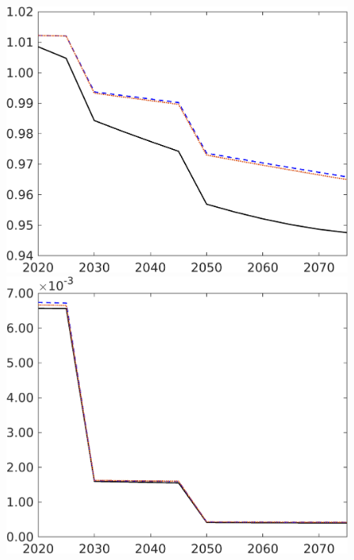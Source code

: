 \begin{figure}[h!!]
\begin{minipage}[]{0.32\textwidth}
\end{minipage}
\begin{minipage}[]{0.32\textwidth}
\includegraphics[width=1\textwidth]{../../codding_model/own_basedOnFried/optimalPol_elastS_DisuSci/figures/all_1705/pg_CompEffOPT_T_NoTaus_spillover0_noskill1_sep1_BN0_ineq0_red0_etaa0.79_lgd0.png}
\end{minipage}
\begin{minipage}[]{0.32\textwidth}
	\includegraphics[width=1\textwidth]{../../codding_model/own_basedOnFried/optimalPol_elastS_DisuSci/figures/all_1705/Lf_CompEffOPT_T_NoTaus_spillover0_noskill1_sep1_BN0_ineq0_red0_etaa0.79_lgd0.png}

\end{minipage}
\end{figure}
